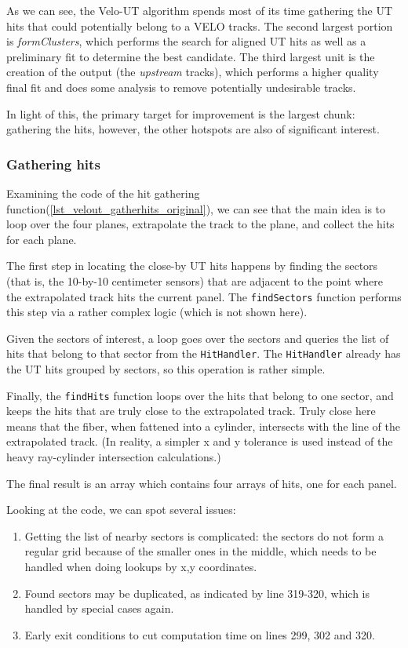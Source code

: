 \documentclass[12pt]{article}
\newcommand{\code}[1]{\texttt{#1}}
\begin{document}
As we can see, the Velo-UT algorithm spends most of its time gathering the UT hits that could potentially belong to a VELO tracks. The second largest portion is \textit{formClusters}, which performs the search for aligned UT hits as well as a preliminary fit to determine the best candidate. The third largest unit is the creation of the output (the \textit{upstream} tracks), which performs a higher quality final fit and does some analysis to remove potentially undesirable tracks.

In light of this, the primary target for improvement is the largest chunk: gathering the hits, however, the other hotspots are also of significant interest.


\subsubsection{Gathering hits}

Examining the code of the hit gathering function(\ref{lst_velout_gatherhits_original}), we can see that the main idea is to loop over the four planes, extrapolate the track to the plane, and collect the hits for each plane.

The first step in locating the close-by UT hits happens by finding the sectors (that is, the 10-by-10 centimeter sensors) that are adjacent to the point where the extrapolated track hits the current panel. The \code{findSectors} function performs this step via a rather complex logic (which is not shown here).

Given the sectors of interest, a loop goes over the sectors and queries the list of hits that belong to that sector from the \code{HitHandler}. The \code{HitHandler} already has the UT hits grouped by sectors, so this operation is rather simple.

Finally, the \code{findHits} function loops over the hits that belong to one sector, and keeps the hits that are truly close to the extrapolated track. Truly close here means that the fiber, when fattened into a cylinder, intersects with the line of the extrapolated track. (In reality, a simpler x and y tolerance is used instead of the heavy ray-cylinder intersection calculations.)

The final result is an array which contains four arrays of hits, one for each panel.

\vspace{1pc}

Looking at the code, we can spot several issues:
\begin{enumerate}
	\item Getting the list of nearby sectors is complicated: the sectors do not form a regular grid because of the smaller ones in the middle, which needs to be handled when doing lookups by x,y coordinates.
	\item Found sectors may be duplicated, as indicated by line 319-320, which is handled by special cases again.
	\item Early exit conditions to cut computation time on lines 299, 302 and 320.
\end{enumerate}
\end{document}
